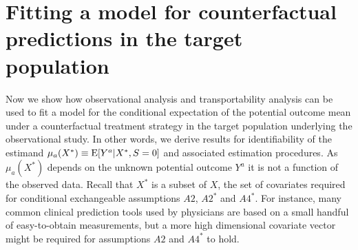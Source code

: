 \documentclass[11pt]{article}
\DeclareMathOperator{\E}{\textnormal{\mbox{E}}}
\begin{document}
\section*{Fitting a model for counterfactual predictions in the target population}

Now we show how observational analysis and transportability analysis can be used to fit a model for the conditional expectation of the potential outcome mean under a counterfactual treatment strategy in the target population underlying the observational study. In other words, we derive results for identifiability of the estimand $\mu_a(X^*) \equiv \E[Y^a|X^*,S=0]$ and associated estimation procedures. As $\mu_a(X^*)$ depends on the unknown potential outcome $Y^a$ it is not a function of the observed data. Recall that $X^*$ is a subset of $X$, the set of covariates required for conditional exchangeable assumptions $A2$, $A2^*$ and $A4^*$. For instance, many common clinical prediction tools used by physicians are based on a small handful of easy-to-obtain measurements, but a more high dimensional covariate vector might be required for assumptions $A2$ and $A4^*$ to hold. 



\end{document}
